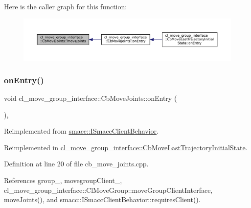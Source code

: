 Here is the caller graph for this function\+:
\nopagebreak
\begin{figure}[H]
\begin{center}
\leavevmode
\includegraphics[width=350pt]{classcl__move__group__interface_1_1CbMoveJoints_ad91d243eb8a818e240d85e5a7fdea68d_icgraph}
\end{center}
\end{figure}
\mbox{\label{classcl__move__group__interface_1_1CbMoveJoints_a23e4181af695aed9fa6bb4ae3f17fd76}} 
\subsubsection{\texorpdfstring{on\+Entry()}{onEntry()}}
{\footnotesize\ttfamily void cl\+\_\+move\+\_\+group\+\_\+interface\+::\+Cb\+Move\+Joints\+::on\+Entry (\begin{DoxyParamCaption}{ }\end{DoxyParamCaption})\hspace{0.3cm}{\ttfamily [override]}, {\ttfamily [virtual]}}



Reimplemented from \hyperlink{classsmacc_1_1ISmaccClientBehavior_a3ec24a839087c550e1d62a81e48cf530}{smacc\+::\+I\+Smacc\+Client\+Behavior}.



Reimplemented in \hyperlink{classcl__move__group__interface_1_1CbMoveLastTrajectoryInitialState_ad51f4883ea1f7442875cda06c3d474c3}{cl\+\_\+move\+\_\+group\+\_\+interface\+::\+Cb\+Move\+Last\+Trajectory\+Initial\+State}.



Definition at line 20 of file cb\+\_\+move\+\_\+joints.\+cpp.



References group\+\_\+, movegroup\+Client\+\_\+, cl\+\_\+move\+\_\+group\+\_\+interface\+::\+Cl\+Move\+Group\+::move\+Group\+Client\+Interface, move\+Joints(), and smacc\+::\+I\+Smacc\+Client\+Behavior\+::requires\+Client().



